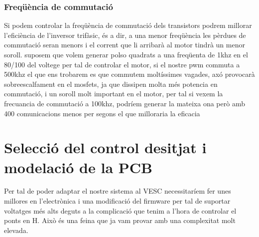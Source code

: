 \subsubsection{Freqüència de commutació}

Si podem controlar la freqüència de commutació dels transistors podrem millorar l'eficiència de l'inversor trifàsic, és a dir, a una menor freqüència les pèrdues de commutació seran menors i el corrent que li arribarà al motor tindrà un menor soroll. suposem que volem generar polso quadrats a una freqüenta de 1khz en el 80/100 del voltege per tal de controlar el motor, si el nostre pwm commuta a 500khz el que ens trobarem es que commutem moltíssimes vagades, axó provocarà sobreescalfament en el mosfets, ja que dissipen molta més potencia en commutació, i un soroll molt important en el motor, per tal si vexem la frecuancia de commutació a 100khz, podríem generar la mateixa ona però amb 400 comunicacions menos per segons el que milloraria la eficacia


\section{Selecció del control desitjat i modelació de la PCB}

Per tal de poder adaptar el nostre sistema al VESC necessitaríem fer unes millores en l'electrònica i una modificació del firmware per tal de suportar voltatges més alts deguts a la complicació que tenim a l'hora de controlar el ponts en H. Això és una feina que ja vam provar amb una complexitat molt elevada.
